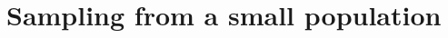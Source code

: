 \documentclass[slidestop,compress,mathserif]{beamer}
\makeatletter
\def\chp3@path{../../Chp 3}
\makeatother
\begin{document}










\section{Sampling from a small population}

\end{document}
